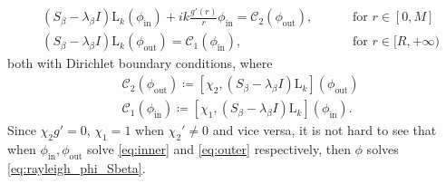 \documentclass[11pt,reqno]{amsproc}
\newcommand{\red}[1]{\textcolor{red}{#1}}
\def\e{{\rm e}}
\def\de{{\partial}}
\newcommand{\rmin}{\mathrm{in}}
\newcommand{\rmout}{\mathrm{out}}
\newcommand{\rmL}{\mathrm{L}}
\theoremstyle{definition}
\theoremstyle{definition}
\numberwithin{equation}{section}
\begin{document}
\begin{align}
\label{eq:inner}&\left(S_\beta -\lambda_\beta I\right)\rmL_k(\phi_{\rmin})+ik\frac{g'(r)}{r}\phi_{\rmin}=\mathcal{C}_2(\phi_{\rmout}), \qquad  &\text{ for } r\in [0,M]\\
\label{eq:outer}&\left(S_\beta -\lambda_\beta I\right)\rmL_k(\phi_{\rmout})=\mathcal{C}_1(\phi_{\rmin}), \qquad& \text{ for } r\in [R,+\infty)
\end{align}
both with Dirichlet boundary conditions, where 
\begin{align}
   \label{def:Rout} &\mathcal{C}_2(\phi_{\rmout})\coloneqq[\chi_2,(S_\beta  - \lambda_\beta I) \rmL_k](\phi_{\rmout})\\
        \label{def:Rin}&\mathcal{C}_1(\phi_{\rmin})\coloneqq[\chi_1,(S_\beta  - \lambda_\beta I) \rmL_k](\phi_{\rmin}).
\end{align}
Since $\chi_2g'=0$, $\chi_1=1$ when $\chi_2'\neq 0$ and vice versa, it is not hard to see that when $\phi_{\rmin},\phi_{\rmout}$ solve \cref{eq:inner} and \cref{eq:outer} respectively,  then $\phi$ solves \cref{eq:rayleigh_phi_Sbeta}.
\end{document}

